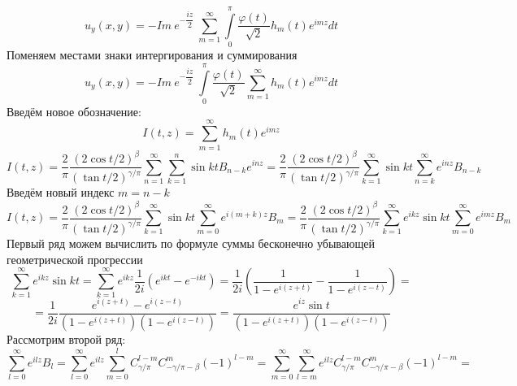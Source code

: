 \documentclass[12pt, a4paper]{article}
\begin{document}
	\begin{equation*}
		u_y(x,y)  = -  Im \ e^{-\dfrac{iz}{2}}\ \sum\limits_{m=1}^{\infty}  \int\limits_0^\pi \dfrac{\varphi(t)}{\sqrt2}  h_{m}(t)  e^{im z}  dt
	\end{equation*}
	Поменяем местами знаки интергирования и суммирования
	\begin{equation*}
		u_y(x,y)  = -  Im \ e^{-\dfrac{iz}{2}}\  \int\limits_0^\pi \dfrac{\varphi(t)}{\sqrt2}  \sum\limits_{m=1}^{\infty}   h_{m}(t)  e^{im z}  dt
	\end{equation*}
	Введём новое обозначение:
	\begin{equation*}
		I(t,z) = \sum\limits_{m=1}^{\infty}  h_{m}(t)  e^{im z}
	\end{equation*}
	\begin{equation*}
		I(t,z) =\dfrac{2}{\pi}\dfrac{(2\cos{t/2})^\beta}{(\tan{t/2})^{\gamma/\pi}} \sum\limits_{n=1}^{\infty}   \sum\limits_{k=1}^n \sin{kt} B_{n-k} e^{inz} = 
		\dfrac{2}{\pi}\dfrac{(2\cos{t/2})^\beta}{(\tan{t/2})^{\gamma/\pi}} \sum\limits_{k=1}^{\infty} \sin{kt} \sum\limits_{n=k}^{\infty} e^{inz} B_{n-k}
	\end{equation*}
	Введём новый индекс $m = n - k$
	\begin{equation*}
		I(t,z) = \dfrac{2}{\pi}\dfrac{(2\cos{t/2})^\beta}{(\tan{t/2})^{\gamma/\pi}} \sum\limits_{k=1}^{\infty} \sin{kt} \sum\limits_{m =0 }^{\infty} e^{i(m+k)z} B_{m} = 
		\dfrac{2}{\pi}\dfrac{(2\cos{t/2})^\beta}{(\tan{t/2})^{\gamma/\pi}} \sum\limits_{k=1}^{\infty} e^{ikz}\sin{kt} \sum\limits_{m =0 }^{\infty} e^{imz} B_{m}
	\end{equation*}
	Первый ряд можем вычислить по формуле суммы бесконечно убывающей геометрической прогрессии
	\begin{equation*}
		\sum\limits_{k=1}^{\infty} e^{ikz}\sin{kt} =  \sum\limits_{k=1}^{\infty} e^{ikz}\dfrac{1}{2i}\left(e^{ikt} - e^{-ikt}\right) = \dfrac1{2i} \left(\dfrac{1}{1 - e^{i(z+t)}} -  \dfrac{1}{1 - e^{i(z-t)}}\right) = 
	\end{equation*}
	\begin{equation*}
		= \dfrac{1}{2i}  \dfrac{e^{i(z+t)} - e^{i(z-t)}}{\left(1 - e^{i(z+t)} \right) \left(1 - e^{i(z-t)}\right)} =  \dfrac{e^{iz} \sin{t}}{\left(1 - e^{i(z+t)} \right) \left(1 - e^{i(z-t)}\right)}
	\end{equation*}
	Рассмотрим второй ряд:
	\begin{equation*}
		\sum\limits_{l =0 }^{\infty} e^{ilz} B_{l} = \sum\limits_{l =0 }^{\infty} e^{ilz} \sum\limits_{m=0}^{l} C^{l - m}_{\gamma/\pi} C^{m}_{-\gamma/\pi - \beta} (-1)^{l-m} = \sum\limits_{m=0}^{\infty} \sum\limits_{l=m}^{\infty} e^{ilz} C^{l - m}_{\gamma/\pi} C^{m}_{-\gamma/\pi - \beta} (-1)^{l-m} = 
	\end{equation*}
\end{document}
